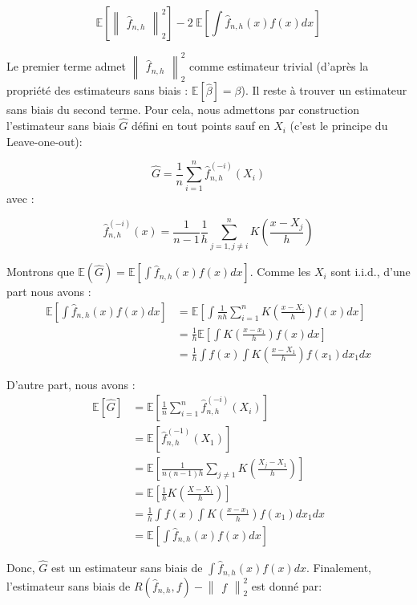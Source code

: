 \documentclass[
]{book}
\begin{document}
\[
\mathbb{E}[\begin{Vmatrix}\hat {f}_{n,h}\end{Vmatrix}_2^2] -2~\mathbb{E}[\int \hat {f}_{n,h}(x)f(x)dx]
\]

Le premier terme admet \(\begin{Vmatrix}\hat {f}_{n,h}\end{Vmatrix}_2^2\) comme estimateur trivial (d'après la propriété des estimateurs sans biais : \(\mathbb{E}[\hat {\beta}]=\beta\)).\newline
Il reste à trouver un estimateur sans biais du second terme. Pour cela, nous admettons par construction l'estimateur sans biais \(\hat {G}\) défini en tout points sauf en \(X_i\) (c'est le principe du Leave-one-out):

\[
\hat{G} = \frac{1}{n}\sum_{i=1}^n\hat {f}_{n,h}^{(-i)}(X_i)
\]
avec :

\[
  \hat {f}_{n,h}^{(-i)}(x)= \frac{1}{n-1}\frac{1}{h}\sum_{j=1,j\ne i}^nK(\frac{x-X_j}{h})
\]

Montrons que \(\mathbb{E}(\hat{G})=\mathbb{E}[\int \hat{f}_{n,h}(x)f(x)dx]\).\newline
Comme les \(X_i\) sont i.i.d., d'une part nous avons :
\[
\begin{aligned}
\mathbb{E}[\int \hat {f}_{n,h}(x)f(x)dx]&= \mathbb{E}[\int \frac {1}{nh}\sum_{i=1}^nK(\frac {x-X_i}{h})f(x)dx]\\
&=\frac{1}{h}\mathbb{E}[\int K(\frac {x-x_1}{h})f(x)dx] \\
&=\frac{1}{h}\int f(x)\int K(\frac {x-X_1}{h})f(x_1)dx_1dx
\end{aligned}
\]

D'autre part, nous avons :
\[ 
\begin{aligned}
\mathbb{E}[\hat{G}]&=\mathbb{E}[\frac{1}{n}\sum_{i=1}^n\hat{f}_{n,h}^{(-i)}(X_i)]\\
&=\mathbb{E}[\hat{f}_{n,h}^{(-1)}(X_1)]\\
&=\mathbb{E}[\frac{1}{n(n-1)h}\sum_{j\ne 1}K(\frac{X_j-X_1}{h})]\\
&=\mathbb{E}[\frac{1}{h}K(\frac{X-X_1}{h})]\\
&=\frac{1}{h}\int f(x)\int K(\frac{x-x_1}{h})f(x_1)dx_1dx\\
&=\mathbb{E}[\int \hat{f}_{n,h}(x)f(x)dx] 
\end{aligned}
\]

Donc, \(\hat{G}\) est un estimateur sans biais de \(\int\hat{f}_{n,h}(x)f(x)dx\). Finalement, l'estimateur sans biais de \(R(\hat{f}_{n,h}, f)-\begin{Vmatrix}{f}\end{Vmatrix}_2^2\) est donné par:
\end{document}
